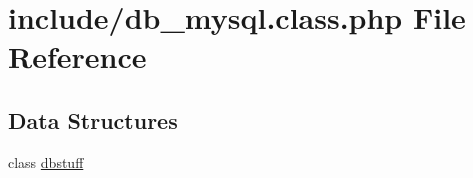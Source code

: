 \hypertarget{db__mysql_8class_8php}{\section{include/db\+\_\+mysql.class.\+php File Reference}
\label{db__mysql_8class_8php}
}
\subsection*{Data Structures}
\begin{DoxyCompactItemize}
\item 
class \hyperlink{classdbstuff}{dbstuff}
\end{DoxyCompactItemize}
